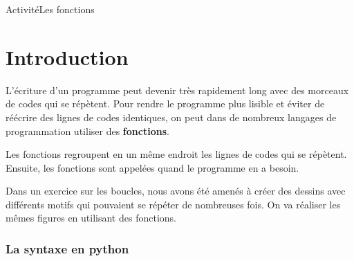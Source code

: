 \documentclass[11pt,a4paper]{article}
\begin{document}
\begin{NSI}
{Activité}{Les fonctions}
\end{NSI}

\section*{Introduction}
L'écriture d'un programme peut devenir très rapidement long avec des morceaux de codes qui se répètent. Pour rendre le programme plus lisible et éviter de réécrire des lignes de codes identiques, on peut dans de nombreux langages de programmation utiliser des \textbf{fonctions}.\medskip

Les fonctions regroupent en un même endroit les lignes de codes qui se répètent. Ensuite, les fonctions sont appelées quand le programme en a besoin.\medskip

Dans un exercice sur les boucles, nous avons été amenés à créer des dessins avec différents motifs qui pouvaient se répéter de nombreuses fois. On va réaliser les mêmes figures en utilisant des fonctions.

\subsubsection*{La syntaxe en python}
\end{document}
